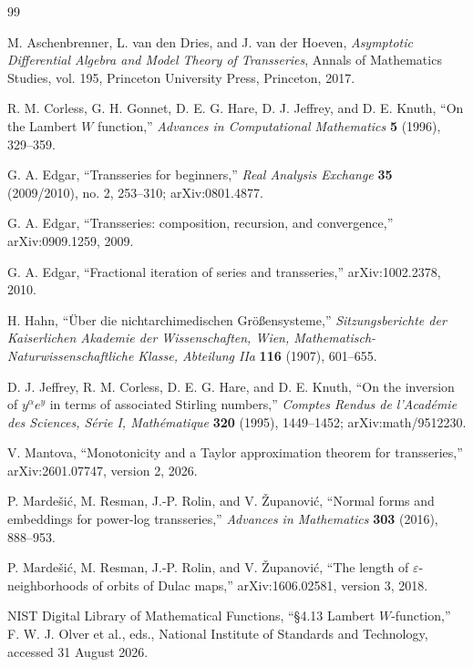 \documentclass[11pt,openany]{book}
\theoremstyle{definition}
\theoremstyle{plain}
\theoremstyle{remark}
\begin{document}
\begin{thebibliography}{99}

M. Aschenbrenner, L. van den Dries, and J. van der Hoeven,
\emph{Asymptotic Differential Algebra and Model Theory of Transseries},
Annals of Mathematics Studies, vol. 195,
Princeton University Press, Princeton, 2017.

R. M. Corless, G. H. Gonnet, D. E. G. Hare, D. J. Jeffrey, and D. E. Knuth,
``On the Lambert \(W\) function,''
\emph{Advances in Computational Mathematics} \textbf{5} (1996), 329--359.

G. A. Edgar,
``Transseries for beginners,''
\emph{Real Analysis Exchange} \textbf{35} (2009/2010), no. 2, 253--310;
arXiv:0801.4877.

G. A. Edgar,
``Transseries: composition, recursion, and convergence,''
arXiv:0909.1259, 2009.

G. A. Edgar,
``Fractional iteration of series and transseries,''
arXiv:1002.2378, 2010.

H. Hahn,
``\"Uber die nichtarchimedischen Gr\"o\ss ensysteme,''
\emph{Sitzungsberichte der Kaiserlichen Akademie der Wissenschaften, Wien,
Mathematisch-Naturwissenschaftliche Klasse, Abteilung IIa}
\textbf{116} (1907), 601--655.

D. J. Jeffrey, R. M. Corless, D. E. G. Hare, and D. E. Knuth,
``On the inversion of \(y^\alpha e^y\) in terms of associated Stirling numbers,''
\emph{Comptes Rendus de l'Acad\'emie des Sciences, S\'erie I, Math\'ematique}
\textbf{320} (1995), 1449--1452;
arXiv:math/9512230.

V. Mantova,
``Monotonicity and a Taylor approximation theorem for transseries,''
arXiv:2601.07747, version 2, 2026.

P. Marde\v{s}i\'c, M. Resman, J.-P. Rolin, and V. \v{Z}upanovi\'c,
``Normal forms and embeddings for power-log transseries,''
\emph{Advances in Mathematics} \textbf{303} (2016), 888--953.

P. Marde\v{s}i\'c, M. Resman, J.-P. Rolin, and V. \v{Z}upanovi\'c,
``The length of \(\varepsilon\)-neighborhoods of orbits of Dulac maps,''
arXiv:1606.02581, version 3, 2018.

NIST Digital Library of Mathematical Functions,
``\S4.13 Lambert \(W\)-function,''
F. W. J. Olver et al., eds., National Institute of Standards and Technology,
accessed 31 August 2026.


\end{thebibliography}
\end{document}
